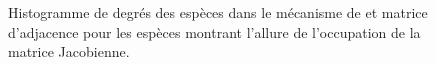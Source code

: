 \begin{figure}[h]
  \hfill

  \caption{Histogramme de degrés des espèces dans le mécanisme de \citet{Norinaga2009} et matrice d'adjacence pour les espèces montrant l'allure de l'occupation de la matrice Jacobienne.}
\end{figure}

